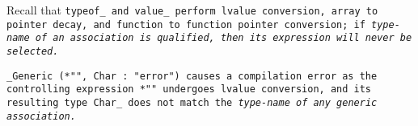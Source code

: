 \note Recall that \tt{typeof_} and \tt{value_} perform lvalue conversion,
array to pointer decay, and function to function pointer conversion;
if \it{type-name} of an association is qualified,
then its \it{expression} will never be selected.

\example \tt{_Generic (*"", Char : "error")} causes a compilation error as the
controlling expression \tt{*""} undergoes lvalue conversion, and its resulting
type \tt{Char_} does not match the \it{type-name} of any generic association.


